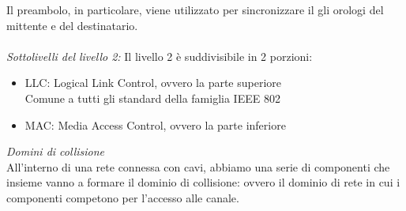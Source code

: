 \documentclass[11pt, oneside]{article}   	%
\begin{document}
Il preambolo, in particolare, viene utilizzato per sincronizzare il gli orologi del mittente e del destinatario.\\\\
\emph{Sottolivelli del livello 2:}
Il livello 2 è suddivisibile in 2 porzioni:
\begin{itemize}
\item LLC: Logical Link Control, ovvero la parte superiore\\
Comune a tutti gli standard della famiglia IEEE 802
\item MAC: Media Access Control, ovvero la parte inferiore
\end{itemize}
\emph{Domini di collisione}\\
All'interno di una rete connessa con cavi, abbiamo una serie di componenti che insieme vanno a formare il dominio di collisione: ovvero il dominio di rete in cui i componenti competono per l'accesso alle canale.
\end{document}
